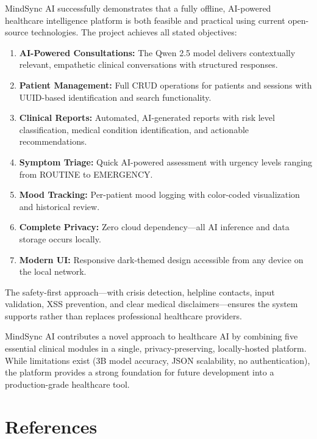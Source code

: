 \documentclass[12pt,a4paper]{report}
\begin{document}
MindSync AI successfully demonstrates that a fully offline, AI-powered healthcare intelligence platform is both feasible and practical using current open-source technologies. The project achieves all stated objectives:

\begin{enumerate}
    \item \textbf{AI-Powered Consultations:} The Qwen 2.5 model delivers contextually relevant, empathetic clinical conversations with structured responses.
    \item \textbf{Patient Management:} Full CRUD operations for patients and sessions with UUID-based identification and search functionality.
    \item \textbf{Clinical Reports:} Automated, AI-generated reports with risk level classification, medical condition identification, and actionable recommendations.
    \item \textbf{Symptom Triage:} Quick AI-powered assessment with urgency levels ranging from ROUTINE to EMERGENCY.
    \item \textbf{Mood Tracking:} Per-patient mood logging with color-coded visualization and historical review.
    \item \textbf{Complete Privacy:} Zero cloud dependency---all AI inference and data storage occurs locally.
    \item \textbf{Modern UI:} Responsive dark-themed design accessible from any device on the local network.
\end{enumerate}

The safety-first approach---with crisis detection, helpline contacts, input validation, XSS prevention, and clear medical disclaimers---ensures the system supports rather than replaces professional healthcare providers.

MindSync AI contributes a novel approach to healthcare AI by combining five essential clinical modules in a single, privacy-preserving, locally-hosted platform. While limitations exist (3B model accuracy, JSON scalability, no authentication), the platform provides a strong foundation for future development into a production-grade healthcare tool.

\chapter*{References}
\end{document}
